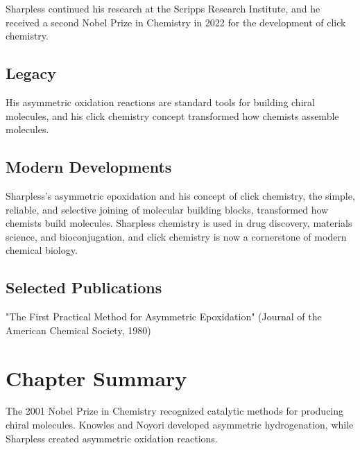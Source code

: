 Sharpless continued his research at the Scripps Research Institute, and he received a second Nobel Prize in Chemistry in 2022 for the development of click chemistry.

\subsection*{Legacy}

His asymmetric oxidation reactions are standard tools for building chiral molecules, and his click chemistry concept transformed how chemists assemble molecules.

\subsection*{Modern Developments}

Sharpless's asymmetric epoxidation and his concept of click chemistry, the simple, reliable, and selective joining of molecular building blocks, transformed how chemists build molecules. Sharpless chemistry is used in drug discovery, materials science, and bioconjugation, and click chemistry is now a cornerstone of modern chemical biology.

\subsection*{Selected Publications}

"The First Practical Method for Asymmetric Epoxidation" (Journal of the American Chemical Society, 1980)

\clearpage

\section*{Chapter Summary}

The 2001 Nobel Prize in Chemistry recognized catalytic methods for producing chiral molecules. Knowles and Noyori developed asymmetric hydrogenation, while Sharpless created asymmetric oxidation reactions.
